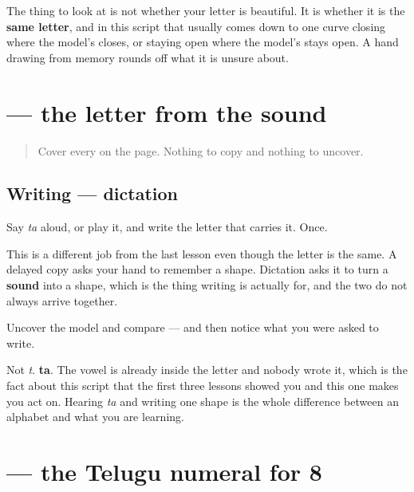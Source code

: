\begin{tcolorbox}[breakable,colback=teal!4,colframe=teal!35!black,title={Before you move on}]
The thing to look at is not whether your letter is beautiful. It is whether it is the \textbf{same letter}, and in this script that usually comes down to one curve closing where the model's closes, or staying open where the model's stays open. A hand drawing from memory rounds off what it is unsure about.
\end{tcolorbox}
\section[\texorpdfstring{\te{త} (ta)}{త (ta)}]{ — the letter from the sound}

\label{lesson:TE-S01-dictation}



\begin{quote}
Cover every \textbf{} on the page. Nothing to copy and nothing to uncover.
\end{quote}

\subsection*{Writing — dictation}
Say \emph{ta} aloud, or play it, and write the letter that carries it. Once.

This is a different job from the last lesson even though the letter is the same. A delayed copy asks your hand to remember a shape. Dictation asks it to turn a \textbf{sound} into a shape, which is the thing writing is actually for, and the two do not always arrive together.

\begin{tcolorbox}[breakable,colback=teal!4,colframe=teal!35!black,title={Before you move on}]
Uncover the model and compare — and then notice what you were asked to write.

Not \emph{t}. \textbf{ta}. The vowel is already inside the letter and nobody wrote it, which is the fact about this script that the first three lessons showed you and this one makes you act on. Hearing \emph{ta} and writing one shape is the whole difference between an alphabet and what you are learning.
\end{tcolorbox}
\section[\texorpdfstring{\te{౮} (8)}{౮ (8)}]{ — the Telugu numeral for 8}

